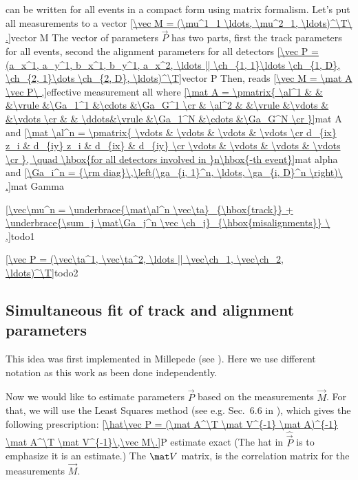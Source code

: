  can be written for all events in a compact form using matrix formalism. Let's put all measurements to a vector
\eqref{\vec M = (\mu^1_1 \ldots, \mu^2_1, \ldots)^\T\ .}{vector M}
The vector of parameters $\vec P$ has two parts, first the track parameters for all events, second the alignment parameters for all detectors
\eqref{\vec P = (a_x^1, a_y^1, b_x^1, b_y^1, a_x^2, \ldots || \ch_{1, 1}\ldots \ch_{1, D}, \ch_{2, 1}\dots \ch_{2, D}, \ldots)^\T}{vector P}
Then,  reads
\eqref{\vec M = \mat A \vec P\ ,}{effective measurement all}
where
\eqref{\mat A = \pmatrix{
\al^1 & 		&		&\vrule	&\Ga_1^1	&\cdots	&\Ga_G^1	\cr
	& \al^2	&		&\vrule	&\vdots		&		&\vdots		\cr
	&		& \ddots&\vrule	&\Ga_1^N	&\cdots	&\Ga_G^N	\cr
}}{mat A}
and
\eqref{\mat \al^n = \pmatrix{
\vdots & \vdots & \vdots & \vdots \cr
d_{ix} z_i & d_{iy} z_i & d_{ix} & d_{iy} \cr
\vdots & \vdots & \vdots & \vdots \cr
}, \quad \hbox{for all detectors involved in }n\hbox{-th event}}{mat alpha}
and
\eqref{\Ga_i^n = {\rm diag}\,\left(\ga_{i, 1}^n, \ldots, \ga_{i, D}^n \right)\ .}{mat Gamma}


\eqref{\vec\mu^n =
\underbrace{\mat\al^n \vec\ta}_{\hbox{track}}
+
\underbrace{\sum_j \mat\Ga_j^n \vec \ch_j}_{\hbox{misalignments}}
\ ,}{todo1}

\eqref{\vec P = (\vec\ta^1, \vec\ta^2, \ldots || \vec\ch_1, \vec\ch_2, \ldots)^\T}{todo2}



\subsection[al sim fit]{Simultaneous fit of track and alignment parameters}

This idea was first implemented in Millepede (see ). Here we use different notation as this work as been done independently.

Now we would like to estimate parameters $\vec P$ based on the measurements $\vec M$. For that, we will use the Least Squares method (see e.g. Sec.~6.6 in ), which gives the following prescription:
\eqref{\hat\vec P = (\mat A^\T \mat V^{-1} \mat A)^{-1} \mat A^\T \mat V^{-1}\,\vec M\.}{P estimate exact}
(The hat in $\hat\vec P$ is to emphasize it is an estimate.) The $\mat V$ matrix, is the correlation matrix for the measurements $\vec M$.

